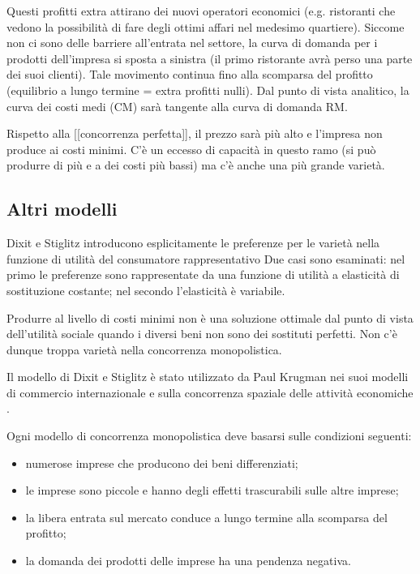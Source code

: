 Questi profitti extra attirano dei nuovi operatori economici (e.g. ristoranti 
che vedono la possibilità di fare degli ottimi affari nel medesimo quartiere). 
Siccome non ci sono delle barriere all'entrata nel settore, la curva di domanda 
per i prodotti dell'impresa si sposta a sinistra (il primo ristorante avrà 
perso una parte dei suoi clienti). Tale movimento continua fino alla scomparsa 
del profitto (equilibrio a lungo termine = extra profitti nulli). Dal punto di 
vista analitico, la curva dei costi medi (CM) sarà tangente alla curva di 
domanda RM.

Rispetto alla [[concorrenza perfetta]], il prezzo sarà più alto e l'impresa non 
produce ai costi minimi. C'è un eccesso di capacità in questo ramo (si può 
produrre di più e a dei costi più bassi) ma c'è anche una più grande varietà.

\subsection{Altri modelli}

Dixit e Stiglitz introducono esplicitamente le preferenze 
per le varietà nella funzione di utilità del consumatore rappresentativo
Due casi 
sono esaminati: nel primo le preferenze sono rappresentate da una funzione di 
utilità a elasticità di sostituzione costante; nel secondo l'elasticità è 
variabile.

Produrre al livello di costi minimi non è una soluzione ottimale dal punto di 
vista dell'utilità sociale quando i diversi beni non sono dei sostituti 
perfetti. Non c'è dunque troppa varietà nella concorrenza monopolistica.

Il modello di Dixit e Stiglitz è stato utilizzato da Paul Krugman nei suoi 
modelli di commercio internazionale e sulla concorrenza spaziale delle attività 
economiche
.

Ogni modello di concorrenza monopolistica deve basarsi sulle condizioni 
seguenti:

\begin{itemize} [noitemsep]
 \item numerose imprese che producono dei beni differenziati;
 \item le imprese sono piccole e hanno degli effetti trascurabili sulle altre 
imprese;
 \item la libera entrata sul mercato conduce a lungo termine alla scomparsa del 
profitto;
 \item la domanda dei prodotti delle imprese ha una pendenza negativa.
\end{itemize}

